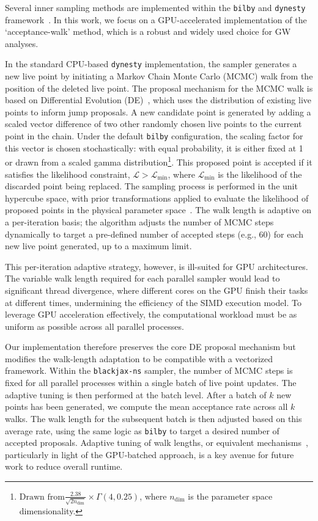 \documentclass[fleqn,usenatbib]{mnras}
\begin{document}
Several inner sampling methods are implemented within the
\texttt{bilby} and \texttt{dynesty} framework~\citep{bilby_paper, dynesty}. In this work, we
focus on a GPU-accelerated implementation of the `acceptance-walk'
method, which is a robust and widely used choice for GW analyses.

In the standard CPU-based \texttt{dynesty} implementation, the sampler
generates a new live point by initiating a Markov Chain Monte Carlo
(MCMC) walk from the position of the deleted live point. 
The proposal mechanism for the MCMC walk is based on Differential
Evolution (DE)~\citep{DE, DE2}, which uses the distribution of existing live points to
inform jump proposals. A new candidate point is generated by adding a
scaled vector difference of two other randomly chosen live points to the
current point in the chain. Under the default \texttt{bilby} configuration, 
the scaling factor for this vector is chosen stochastically: with equal probability, 
it is either fixed at 1 or drawn from a scaled gamma distribution\footnote{
$\text{Drawn from} \frac{2.38}{\sqrt{2 n_{\textrm{dim}}}} \times \Gamma(4,0.25)$,
where $n_{\textrm{dim}}$ is the parameter space dimensionality.}. This proposed 
point is accepted if it satisfies the likelihood constraint, $\mathcal{L} > \mathcal{L}_{\text{min}}$,
where $\mathcal{L}_{\text{min}}$ is the likelihood of the
discarded point being replaced. The sampling
process is performed in the unit hypercube space, with prior
transformations applied to evaluate the likelihood of proposed points in the physical parameter space~\citep{dynesty}. 
The walk length is adaptive on a per-iteration
basis; the algorithm adjusts the number of MCMC steps dynamically to
target a pre-defined number of accepted steps (e.g., 60) for each new
live point generated, up to a maximum limit.

This per-iteration adaptive strategy, however, is ill-suited for GPU
architectures. The variable walk length required for each parallel
sampler would lead to significant thread divergence, where different
cores on the GPU finish their tasks at different times, undermining the
efficiency of the SIMD execution model. To leverage GPU acceleration
effectively, the computational workload must be as uniform as possible
across all parallel processes.

Our implementation therefore preserves the core DE proposal mechanism but
modifies the walk-length adaptation to be compatible with a vectorized
framework. Within the \texttt{blackjax-ns} sampler, the number of MCMC
steps is fixed for all parallel processes within a single batch of
live point updates. The adaptive tuning is then performed at the batch
level. After a batch of $k$ new points has been generated, we compute
the mean acceptance rate across all $k$ walks. The walk length for the
subsequent batch is then adjusted based on this average rate,
using the same logic as \texttt{bilby} to target a desired number of
accepted proposals. Adaptive tuning of walk lengths, or equivalent 
mechanisms~\citep{dau2021wastefreesequentialmontecarlo}, particularly 
in light of the GPU-batched approach, is a key avenue for future work 
to reduce overall runtime.
\end{document}
